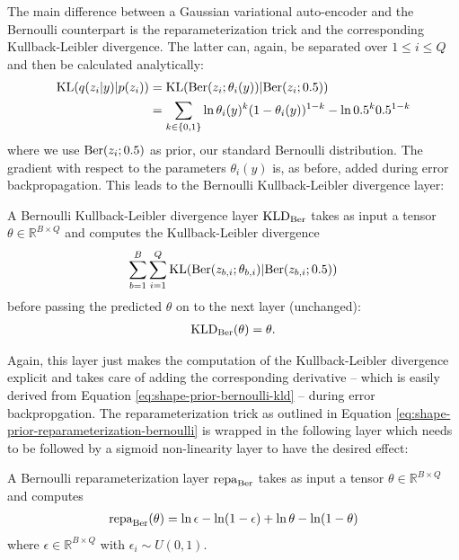 The main difference between a Gaussian variational auto-encoder and
the Bernoulli counterpart is the reparameterization trick and the corresponding
Kullback-Leibler divergence. The latter can, again, be separated over $1 \leq i \leq Q$
and then be calculated analytically:
\begin{align}
  \mathrm{KL}(q(z_i | y) | p(z_i)) &= \mathrm{KL}(\mathrm{Ber}(z_i; \theta_i(y)) | \mathrm{Ber}(z_i; 0.5))\\
  &= \sum_{k \in \{0,1\}} \ln \theta_i(y)^k (1 - \theta_i(y))^{1 - k} - \ln 0.5^k 0.5^{1-k}
  \label{eq:shape-prior-bernoulli-kld}
\end{align}
where we use $\mathrm{Ber}(z_i;0.5)$ as prior, \ie our standard Bernoulli
distribution. The gradient with respect to the parameters $\theta_i(y)$
is, as before, added during error backpropagation. This leads to
the Bernoulli Kullback-Leibler divergence layer:

\begin{definition}
  \label{def:shape-prior-bernoulli-kld}
  A Bernoulli Kullback-Leibler divergence layer $\text{KLD}_{\mathrm{Ber}}$ takes as
  input a tensor $\theta \in \mathbb{R}^{B \times Q}$ and computes the Kullback-Leibler
  divergence
  \begin{align}
    \sum_{b = 1}^B \sum_{i = 1}^Q \mathrm{KL}(\mathrm{Ber}(z_{b,i}; \theta_{b,i}) |  \mathrm{Ber}(z_{b,i}; 0.5))
  \end{align}
  before passing the predicted $\theta$ on to the next layer (unchanged):
  \begin{align}
    \text{KLD}_{\mathrm{Ber}}(\theta) = \theta.
  \end{align}
\end{definition}

Again, this layer just makes the computation of the Kullback-Leibler
divergence explicit and takes care of adding the corresponding derivative
-- which is easily derived from Equation \eqref{eq:shape-prior-bernoulli-kld} --
during error backpropgation.
The reparameterization trick as outlined in Equation
\eqref{eq:shape-prior-reparameterization-bernoulli} is wrapped in the following
layer which needs to be followed by a sigmoid non-linearity layer
to have the desired effect:

\begin{definition}
  \label{def:shape-prior-bernoulli-repa}
  A Bernoulli reparameterization layer $\text{repa}_{\mathrm{Ber}}$ takes as
  input a tensor $\theta \in \mathbb{R}^{B \times Q}$ and computes
  \begin{align}
    \text{repa}_{\mathrm{Ber}}(\theta) = \ln \epsilon - \ln (1 - \epsilon)
    + \ln \theta -\ln (1 - \theta)
  \end{align}
  where $\epsilon \in \mathbb{R}^{B \times Q}$ with $\epsilon_i \sim U(0,1)$.
\end{definition}

